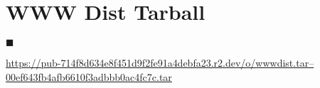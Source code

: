 


\newcommand{\sitebackupWwwdistTarball}[2]{
    \parbox[t]{1.5em}{$\blacksquare$}\hfill%
    \parbox[t]{\linewidth-2em}{%
        \small\ttfamily\href{#1}{#2}
    }%
    \par
    \vskip 11pt
}




\section*{WWW Dist Tarball}

\sitebackupWwwdistTarball{https://pub-714f8d634e8f451d9f2fe91a4debfa23.r2.dev/o/wwwdist.tar--00ef643fb4afb6610f3adbbb0ac4fc7c.tar}{https://pub-714f8d634e8f451d9f2fe91a4debfa23.r2.dev/\linebreak{}o/wwwdist.tar--00ef643fb4afb6610f3adbbb0ac4fc7c.tar}


